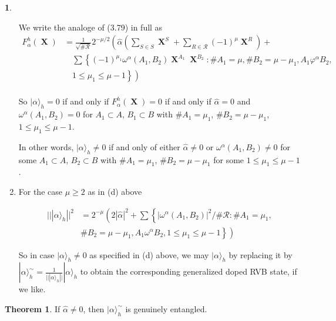 \documentclass[a4paper,12pt]{article}
\DeclareMathOperator{\x}{\mathrm{X}}
\theoremstyle{definition}
\theoremstyle{underlinethm}
\newtheorem{thm}{Theorem}[section]
\theoremstyle{definition}
\newtheorem{subsubsec}{}[subsection]
\begin{document}
\begin{subsubsec}
\begin{enumerate}[label = (\alph*)]
We write the analoge of (3.79) in full as
\begin{align*}
F_{\alpha}^{h} (\boldsymbol{\x}) &= \frac{1}{\sqrt{\# \mathcal{R}}} 2^{-\mu/2} \left(\hat{\alpha} \left(\sum_{S \in S} \boldsymbol{\x}^{S} + \sum_{R \in \mathcal{R}} (-1)^{\mu} \boldsymbol{\x}^{R} \right) +\right.\\
&\quad\sum \left\{(-1)^{\mu_{1}} \omega^{\alpha} (A_{1}, B_{2}) \boldsymbol{\x}^{A_{1}} \boldsymbol{\x}^{B_{2}} : \# A_{1}= \mu, \# B_{2} = \mu-\mu_{1}, A_{1} \varphi^{\alpha} B_{2},\right.\\
 &\quad\left.\left. 1 \leq \mu_{1} \leq \mu-1\right\} \right)\tag{4.53}\label{eq-4.53}\\ 
\end{align*}
 
So $| \alpha \rangle_{h} =0$ if and only if $F_{\alpha}^{h} (\boldsymbol{\x})=0$ if and only if $\hat{\alpha}=0$ and $\omega^{\alpha}(A_{1}, B_{2}) =0$ for $A_{1} \subset A$, $B_{1} \subset B$ with $\# A_{1}= \mu_{1}$, $\# B_{2}=\mu-\mu_{1}$, $ 1 \leq \mu_{1} \leq \mu-1$. 

In other words, $| \alpha \rangle_{h} \neq 0$ if and only of either $\hat{\alpha} \neq 0$ or $\omega^{\alpha}(A_{1}, B_{2}) \neq 0$ for some $A_{1}\subset A$, $B_{2}\subset B$ with $\# A_{1} = \mu_{1}$, $\# B_{2} = \mu-\mu_{1}$ for some $1 \leq \mu_{1} \leq \mu-1$.

\item For the case $\mu \geq 2$ as in (d) above

\begin{align*}
|| | \alpha \rangle_{h} ||^{2} &= 2^{-\mu} \left(2| \hat{\alpha} |^{2} \right.+ \sum \left\{ | \omega^{\alpha}(A_{1}, B_{2}) |^{2}/\#\mathcal{R} : \# A_{1} = \mu_{1},\right.\\ 
&\left. \left.\# B_{2} = \mu-\mu_{1}, A_{1} \omega^{\alpha} B_{2}, 1 \leq \mu_{1} \leq \mu-1 \right\}\right)\tag{4.54}\label{eq-4.54}
\end{align*}
  
So in case $| \alpha \rangle_{h} \neq 0$ as specified in (d) above, we may $| \alpha \rangle_{h}$ by replacing it by  $| \alpha \rangle_{h}^{\sim} = \frac{1}{|| | \alpha \rangle_{h} ||} | \alpha \rangle_{h}$ to obtain the corresponding generalized doped RVB state, if we like. 
\end{enumerate}

\end{subsubsec}

\begin{thm}\label{thm-4.4}
If $\hat{\alpha} \neq 0$, then $| \alpha \rangle_{h}^{\sim}$ is genuinely entangled.
\end{thm}
\end{document}
